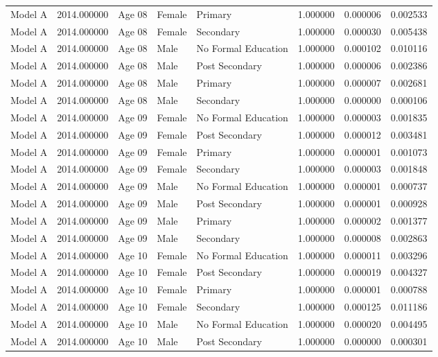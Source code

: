 \begin{table}[ht]
\begin{tabular}{lrlllrrr}
Model A & 2014.000000 & Age 08 & Female & Primary & 1.000000 & 0.000006 & 0.002533 \\
Model A & 2014.000000 & Age 08 & Female & Secondary & 1.000000 & 0.000030 & 0.005438 \\
Model A & 2014.000000 & Age 08 & Male & No Formal Education & 1.000000 & 0.000102 & 0.010116 \\
Model A & 2014.000000 & Age 08 & Male & Post Secondary & 1.000000 & 0.000006 & 0.002386 \\
Model A & 2014.000000 & Age 08 & Male & Primary & 1.000000 & 0.000007 & 0.002681 \\
Model A & 2014.000000 & Age 08 & Male & Secondary & 1.000000 & 0.000000 & 0.000106 \\
Model A & 2014.000000 & Age 09 & Female & No Formal Education & 1.000000 & 0.000003 & 0.001835 \\
Model A & 2014.000000 & Age 09 & Female & Post Secondary & 1.000000 & 0.000012 & 0.003481 \\
Model A & 2014.000000 & Age 09 & Female & Primary & 1.000000 & 0.000001 & 0.001073 \\
Model A & 2014.000000 & Age 09 & Female & Secondary & 1.000000 & 0.000003 & 0.001848 \\
Model A & 2014.000000 & Age 09 & Male & No Formal Education & 1.000000 & 0.000001 & 0.000737 \\
Model A & 2014.000000 & Age 09 & Male & Post Secondary & 1.000000 & 0.000001 & 0.000928 \\
Model A & 2014.000000 & Age 09 & Male & Primary & 1.000000 & 0.000002 & 0.001377 \\
Model A & 2014.000000 & Age 09 & Male & Secondary & 1.000000 & 0.000008 & 0.002863 \\
Model A & 2014.000000 & Age 10 & Female & No Formal Education & 1.000000 & 0.000011 & 0.003296 \\
Model A & 2014.000000 & Age 10 & Female & Post Secondary & 1.000000 & 0.000019 & 0.004327 \\
Model A & 2014.000000 & Age 10 & Female & Primary & 1.000000 & 0.000001 & 0.000788 \\
Model A & 2014.000000 & Age 10 & Female & Secondary & 1.000000 & 0.000125 & 0.011186 \\
Model A & 2014.000000 & Age 10 & Male & No Formal Education & 1.000000 & 0.000020 & 0.004495 \\
Model A & 2014.000000 & Age 10 & Male & Post Secondary & 1.000000 & 0.000000 & 0.000301 \\

\end{tabular}
\end{table}
